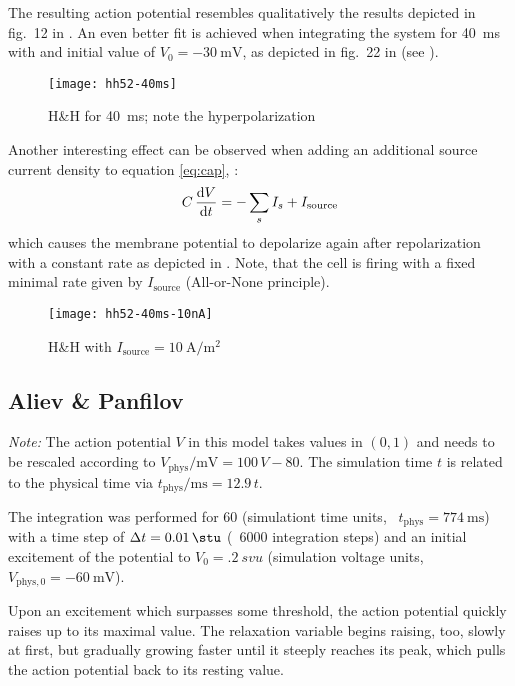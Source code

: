 The resulting action potential resembles qualitatively the results depicted in
fig.~12 in \cite{HH52}. An even better fit is achieved when integrating the
system for \SI{40}{\milli\second} with and initial value of
$V_0=\SI{-30}{\milli\volt}$, as depicted in fig.~22 in \cite{HH52} (see
).

\begin{figure}[h]
    \centering
    \texttt{[image: hh52-40ms]}
    \label{fig:hh2}
    \caption{H\&H for \SI{40}{\milli\second}; note the hyperpolarization}
\end{figure}

Another interesting effect can be observed when adding an additional source
current density to equation \eqref{eq:cap}, \ie:
\begin{equation*}
    C\,\dv{V}{t}=-\sum_{s}I_{s} + I_{\mathrm{source}}
\end{equation*}
which causes the membrane potential to depolarize again after repolarization
with a constant rate as depicted in . Note, that the cell is
firing with a fixed minimal rate given by $I_{\mathrm{source}}$ (All-or-None
principle).

\begin{figure}[h]
    \centering
    \texttt{[image: hh52-40ms-10nA]}
    \label{fig:hh3}
    \caption{H\&H with
        $I_{\mathrm{source}}=\SI{10}{\ampere\per\metre\squared}$}
\end{figure}


\subsection{Aliev \& Panfilov}
\emph{Note:} The action potential $V$ in this model takes values in $(0,1)$ and
needs to be rescaled according to
$V_{\mathrm{phys}}/\si{\milli\volt}=100\,V-80$. The simulation time $t$ is related
to the physical time via $t_{\mathrm{phys}}/\si{\milli\second}=12.9\,t$.

\vspace{\baselineskip}
The integration was performed for \SI{60}{\stu} (simulationt time units,
\ie~$t_{\mathrm{phys}}=\SI{774}{\milli\second}$) with a time step of
$\Delta{t}=\SI{.01}{\stu}$ (\ie~6000 integration steps) and an initial
excitement of the potential to $V_0=\SI{.2}{svu}$ (simulation voltage
units, \ie~$V_{\mathrm{phys},0}=\SI{-60}{\milli\volt}$).

Upon an excitement which surpasses some threshold, the action potential quickly
raises up to its maximal value. The relaxation variable begins raising, too,
slowly at first, but gradually growing faster until it steeply reaches its
peak, which pulls the action potential back to its resting value.

